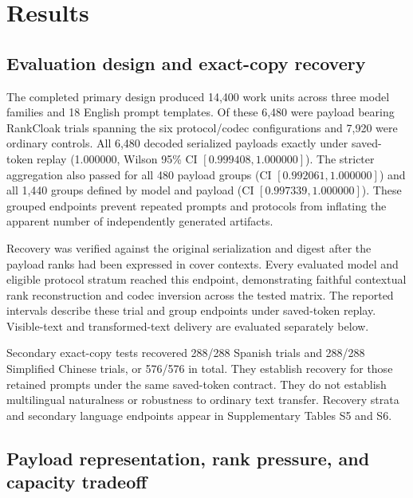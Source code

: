 \documentclass[fleqn,10pt]{wlscirep}
\begin{document}
\section*{Results}\label{sec:results}

\subsection*{Evaluation design and exact-copy recovery}\label{sec:results-recovery}

The completed primary design produced 14,400 work units across three model families and 18 English prompt templates. Of these 6,480 were payload bearing RankCloak trials spanning the six protocol/codec configurations and 7,920 were ordinary controls. All 6,480 decoded serialized payloads exactly under saved-token replay (1.000000, Wilson 95\% CI \([0.999408, 1.000000]\)). The stricter aggregation also passed for all 480 payload groups (CI \([0.992061, 1.000000]\)) and all 1,440 groups defined by model and payload (CI \([0.997339, 1.000000]\)). These grouped endpoints prevent repeated prompts and protocols from inflating the apparent number of independently generated artifacts.

Recovery was verified against the original serialization and digest after the payload ranks had been expressed in cover contexts. Every evaluated model and eligible protocol stratum reached this endpoint, demonstrating faithful contextual rank reconstruction and codec inversion across the tested matrix. The reported intervals describe these trial and group endpoints under saved-token replay. Visible-text and transformed-text delivery are evaluated separately below.

Secondary exact-copy tests recovered 288/288 Spanish trials and 288/288 Simplified Chinese trials, or 576/576 in total. They establish recovery for those retained prompts under the same saved-token contract. They do not establish multilingual naturalness or robustness to ordinary text transfer. Recovery strata and secondary language endpoints appear in Supplementary Tables S5 and S6.



\subsection*{Payload representation, rank pressure, and capacity tradeoff}\label{sec:results-capacity}
\end{document}
